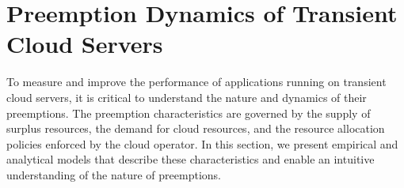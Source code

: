 \section{Preemption Dynamics of Transient Cloud Servers}



To measure and improve the performance of applications running on transient cloud servers, it is critical to understand the nature and dynamics of their preemptions.
The preemption characteristics are governed by the supply of surplus resources, the demand for cloud resources, and the resource allocation policies enforced by the cloud operator.
In this section, we present empirical and analytical models that describe these characteristics and enable an intuitive understanding of the nature of preemptions. 







